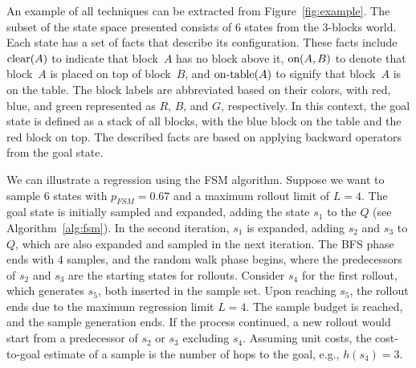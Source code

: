\begin{figure}[ht]
\end{figure}

An example of all techniques can be extracted from Figure~\ref{fig:example}. The subset of the state space presented consists of $6$ states from the $3$-blocks world. Each state has a set of facts that describe its configuration. These facts include $\text{clear}(A)$ to indicate that block~$A$ has no block above it, $\text{on}(A,B)$ to denote that block~$A$ is placed on top of block~$B$, and $\text{on-table}(A)$ to signify that block~$A$ is on the table. The block labels are abbreviated based on their colors, with red, blue, and green represented as $R$, $B$, and $G$, respectively. In this context, the goal state is defined as a stack of all blocks, with the blue block on the table and the red block on top. The described facts are based on applying backward operators from the goal state.

We can illustrate a regression using the FSM algorithm. Suppose we want to sample $6$ states with $p_{FSM}=0.67$ and a maximum rollout limit of $L=4$. The goal state is initially sampled and expanded, adding the state $s_1$ to the $Q$ (see Algorithm~\ref{alg:fsm}). In the second iteration, $s_1$ is expanded, adding $s_2$ and $s_3$ to $Q$, which are also expanded and sampled in the next iteration. The BFS phase ends with $4$ samples, and the random walk phase begins, where the predecessors of $s_2$ and $s_3$ are the starting states for rollouts. Consider $s_4$ for the first rollout, which generates $s_5$, both inserted in the sample set. Upon reaching $s_5$, the rollout ends due to the maximum regression limit $L = 4$. The sample budget is reached, and the sample generation ends. If the process continued, a new rollout would start from a predecessor of $s_2$ or $s_3$ excluding $s_4$. Assuming unit costs, the cost-to-goal estimate of a sample is the number of hops to the goal, e.g., $h(s_4)=3$.

